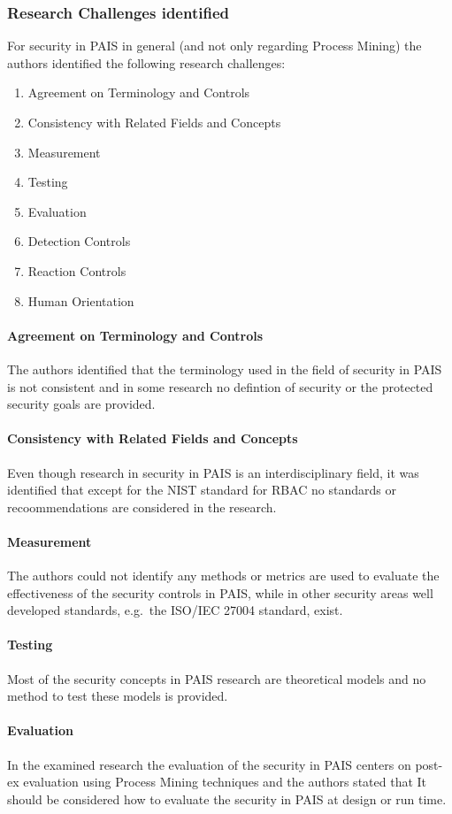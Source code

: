 \documentclass[runningheads]{llncs}
\begin{document}
\subsubsection{Research Challenges identified}\label{Challenges}
For security in PAIS in general (and not only regarding Process Mining) the authors identified the following research challenges:
\begin{enumerate}
    \item Agreement on Terminology and Controls
    \item Consistency with Related Fields and Concepts
    \item Measurement
    \item Testing
    \item Evaluation
    \item Detection Controls
    \item Reaction Controls
    \item Human Orientation
\end{enumerate}
\paragraph{Agreement on Terminology and Controls} The authors identified that the terminology used in the field of security in PAIS is not consistent and in some research no
defintion of security or the protected security goals are provided.
\paragraph{Consistency with Related Fields and Concepts} Even though research in security in PAIS is an interdisciplinary field, it was identified that except for the NIST standard for
RBAC no standards or recoommendations are considered in the research.
\paragraph{Measurement} The authors could not identify any methods or metrics are used to evaluate the effectiveness of the security controls in PAIS, while in other security areas
well developed standards, e.g.\ the ISO/IEC 27004 standard, exist.
\paragraph{Testing} Most of the security concepts in PAIS research are theoretical models and no method to test these models is provided.
\paragraph{Evaluation} In the examined research the evaluation of the security in PAIS centers on post-ex evaluation using Process Mining techniques and the authors stated that It
should be considered how to evaluate the security in PAIS at design or run time.
\end{document}
